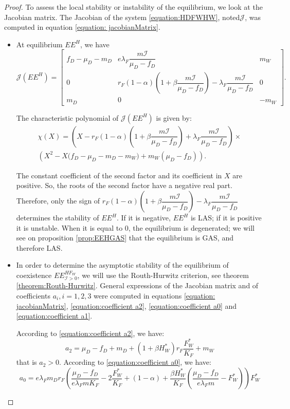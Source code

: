 \documentclass{article}
\newcommand{\lfw}{\lambda_{F}}
\newcommand{\lfw}{\lambda_{F}}
\newcommand{\cI}{\mathcal{I}}
\begin{document}
\begin{proof}
To assess the local stability or instability of the equilibrium, we look at the Jacobian matrix. The Jacobian of the system \eqref{equation:HDFWHW}, noted$ \mathcal{J}$, was computed in equation \eqref{equation: jacobianMatrix}.

\begin{itemize}
\item At equilibrium $EE^{H}$, we have
\begin{equation*}
\mathcal{J}(EE^{H}) = \begin{bmatrix}
f_D-\mu_D - m_D & e \lfw \dfrac{m \cI}{\mu_D - f_D} & m_W \\
0 & r_F(1-\alpha)\left(1+\beta\dfrac{m\cI}{\mu_D - f_D}\right) - \lfw\dfrac{m\cI}{\mu_D - f_D} & 0 \\
m_D & 0 & -m_W
\end{bmatrix}.
\end{equation*}


The characteristic polynomial of $\mathcal{J}(EE^{H})$ is given by:
\begin{multline*}
\chi(X) = \left(X - r_F(1-\alpha)(1+\beta\dfrac{m\cI}{\mu_D - f_D}) + \lfw\dfrac{m\cI}{\mu_D - f_D} \right) \times \\ \left(X^2 - X\Big(f_D - \mu_D - m_D - m_W \Big) + m_W(\mu_D - f_D)\right).
\end{multline*}

The constant coefficient of the second factor and its coefficient in $X$ are positive. So, the roots of the second factor have a negative real part. Therefore, only the sign of $r_F(1-\alpha)(1+\beta\dfrac{m\cI}{\mu_D - f_D}) - \lfw\dfrac{m\cI}{\mu_D - f_D}$ determines the stability of $EE^{H}$. If it is negative, $EE^{H}$ is LAS; if it is positive it is unstable. When it is equal to 0, the equilibrium is degenerated; we will see on proposition \ref{prop:EEHGAS} that the equilibrium is GAS, and therefore LAS.

\item In order to determine the asymptotic stability of the equilibrium of coexistence $EE^{HF_W}_{\cI > 0}$, we will use the Routh-Hurwitz criterion, see theorem \ref{theorem:Routh-Hurwitz}. General expressions of the Jacobian matrix and of coefficients $a_i, i = 1,2,3$ were computed in equations \eqref{equation: jacobianMatrix}, \eqref{equation:coefficient a2}, \eqref{equation:coefficient a0} and \eqref{equation:coefficient a1}. 

According to \eqref{equation:coefficient a2}, we have:
\begin{equation*}
a_2 = \mu_D -f_D + m_D + (1+\beta H_W^*)r_F \dfrac{F_W^*}{K_F} + m_W 
\end{equation*}
that is $a_2>0$. According to \eqref{equation:coefficient a0}, we have:
\begin{equation*}
a_0 = e \lfw m_D r_F \left(\dfrac{\mu_D -f_D }{e \lfw m K_F} - 2\dfrac{F_W^*}{K_F} + (1-\alpha) + \dfrac{\beta H_W^*}{K_F} \left(\dfrac{\mu_D -f_D }{e \lfw m} - F_W^*\right) \right) F_W^*
\end{equation*}


\end{itemize}
\end{proof}
\end{document}
